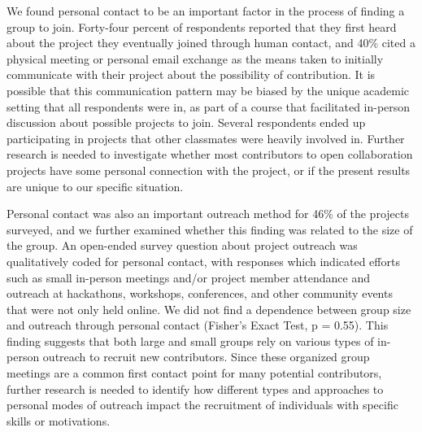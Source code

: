 We found personal contact to be an important factor in the process of finding a group to join. Forty-four percent of respondents reported that they first heard about the project they eventually joined through human contact, and 40\% cited a physical meeting or personal email exchange as the means taken to initially communicate with their project about the possibility of contribution. It is possible that this communication pattern may be biased by the unique academic setting that all respondents were in, as part of a course that facilitated in-person discussion about possible projects to join. Several respondents ended up participating in projects that other classmates were heavily involved in. Further research is needed to investigate whether most contributors to open collaboration projects have some personal connection with the project, or if the present results are unique to our specific situation.

Personal contact was also an important outreach method for 46\% of the projects surveyed, and we further examined whether this finding was related to the size of the group. An open-ended survey question about project outreach was qualitatively coded for personal contact, with responses which indicated efforts such as small in-person meetings and/or project member attendance and outreach at hackathons, workshops, conferences, and other community events that were not only held online. We did not find a dependence between group size and outreach through personal contact (Fisher’s Exact Test, p = 0.55). This finding suggests that both large and small groups rely on various types of in-person outreach to recruit new contributors. Since these organized group meetings are a common first contact point for many potential contributors, further research is needed to identify how different types and approaches to personal modes of outreach impact the recruitment of individuals with specific skills or motivations.